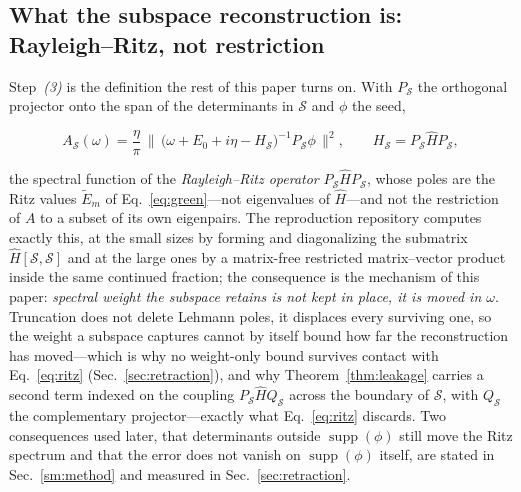 \subsection{What the subspace reconstruction is: Rayleigh--Ritz, not restriction}\label{sec:method:rr}
Step~\emph{(3)} is the definition the rest of this paper turns on.
With $P_{\mathcal S}$ the orthogonal projector onto the span of the determinants in $\mathcal S$ and
$\phi$ the seed,
\begin{widetext}
\begin{equation}
A_{\mathcal S}(\omega)=\frac{\eta}{\pi}\,
\bigl\lVert\,\bigl(\omega+E_0+i\eta-H_{\mathcal S}\bigr)^{-1}P_{\mathcal S}\phi\,\bigr\rVert^{2},
\qquad H_{\mathcal S}=P_{\mathcal S}\hat HP_{\mathcal S},
\label{eq:ritz}
\end{equation}
\end{widetext}
the spectral function of the \emph{Rayleigh--Ritz operator} $P_{\mathcal S}\hat HP_{\mathcal S}$, whose
poles are the Ritz values $\tilde E_m$ of Eq.~\eqref{eq:green}---not eigenvalues of $\hat H$---and
not the restriction of $A$ to a subset of its own eigenpairs. The reproduction repository computes
exactly this, at the small sizes by forming and diagonalizing the submatrix $\hat H[\mathcal S,\mathcal
S]$ and at the large ones by a matrix-free restricted matrix--vector product inside the same continued
fraction; the consequence is the mechanism of this paper: \emph{spectral weight the subspace retains is
not kept in place, it is moved in $\omega$}. Truncation does not delete Lehmann poles, it displaces every surviving one, so the
weight a subspace captures cannot by itself bound how far the reconstruction has moved---which is why
no weight-only bound survives contact with Eq.~\eqref{eq:ritz} (Sec.~\ref{sec:retraction}), and why
Theorem~\ref{thm:leakage} carries a second term indexed on the coupling
$P_{\mathcal S}\hat HQ_{\mathcal S}$ across the boundary of $\mathcal S$, with $Q_{\mathcal S}$ the
complementary projector---exactly what Eq.~\eqref{eq:ritz} discards. Two consequences used later, that
determinants outside $\operatorname{supp}(\phi)$ still move the Ritz spectrum and that the error does not
vanish on $\operatorname{supp}(\phi)$ itself, are stated in Sec.~\ref{sm:method} and measured in
Sec.~\ref{sec:retraction}.

